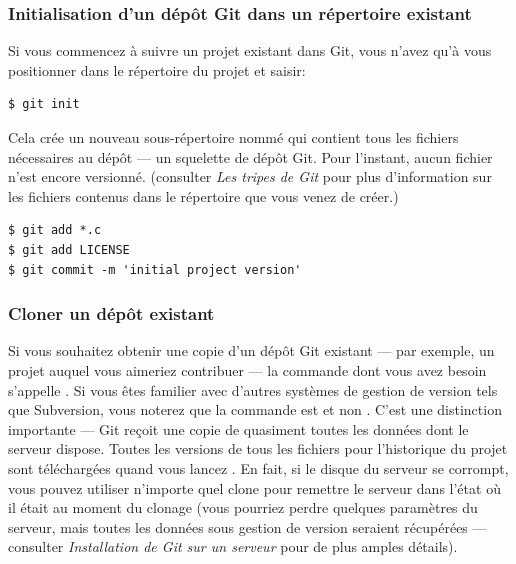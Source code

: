 \subsubsection{Initialisation d'un dépôt Git dans un répertoire existant}

Si vous commencez à suivre un projet existant dans Git, vous n'avez qu'à vous positionner dans le répertoire du projet et saisir:
\begin{Schunk}
\begin{Verbatim}
$ git init
\end{Verbatim}
\end{Schunk}

Cela crée un nouveau sous-répertoire nommé  qui contient tous les fichiers nécessaires au dépôt --- un squelette de dépôt Git.
Pour l'instant, aucun fichier n'est encore versionné.
(consulter \emph{Les tripes de Git} pour plus d'information sur les fichiers contenus dans le répertoire  que vous venez de créer.)
\begin{Schunk}
\begin{Verbatim}
$ git add *.c
$ git add LICENSE
$ git commit -m 'initial project version'
\end{Verbatim}
\end{Schunk}

\subsubsection{Cloner un dépôt existant}
\label{sec:git:cloning}

Si vous souhaitez obtenir une copie d'un dépôt Git existant --- par exemple, un projet auquel vous aimeriez contribuer --- la commande dont vous avez besoin s'appelle .
Si vous êtes familier avec d'autres systèmes de gestion de version tels que Subversion, vous noterez que la commande est  et non .
C'est une distinction importante --- Git reçoit une copie de quasiment toutes les données dont le serveur dispose.
Toutes les versions de tous les fichiers pour l'historique du projet sont téléchargées quand vous lancez .
En fait, si le disque du serveur se corrompt, vous pouvez utiliser n'importe quel clone pour remettre le serveur dans l'état où il était au moment du clonage (vous pourriez perdre quelques paramètres du serveur, mais toutes les données sous gestion de version seraient récupérées --- consulter \emph{Installation de Git sur un serveur} pour de plus amples détails).

